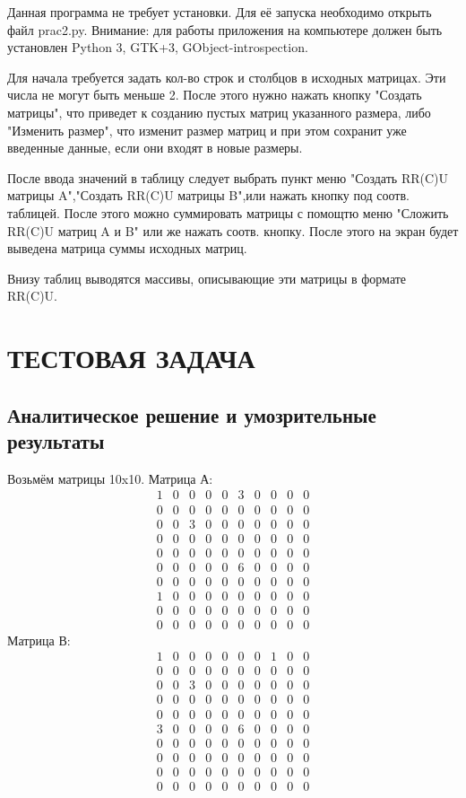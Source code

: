 Данная программа не требует установки. Для её запуска необходимо открыть файл prac2.py. Внимание: для работы приложения на компьютере должен быть установлен Python 3, GTK+3, GObject-introspection.

Для начала требуется задать кол-во строк и столбцов в исходных матрицах. Эти числа не могут быть меньше 2. После этого нужно нажать кнопку "Создать матрицы", что приведет к созданию пустых матриц указанного размера, либо "Изменить размер", что изменит размер матриц и при этом сохранит уже введенные данные, если они входят в новые размеры. 

После ввода значений в таблицу следует выбрать пункт меню "Создать RR(C)U матрицы A","Создать RR(C)U матрицы B",или нажать кнопку под соотв. таблицей. После этого можно суммировать матрицы с помощтю меню "Сложить RR(C)U матриц A и B" или же нажать соотв. кнопку. После этого на экран будет выведена матрица суммы исходных матриц.

Внизу таблиц выводятся  массивы, описывающие эти матрицы в формате RR(C)U.

\section{ТЕСТОВАЯ ЗАДАЧА}
\subsection{Аналитическое решение и умозрительные результаты}
Возьмём матрицы 10x10. Матрица А:
$$
\begin{array}{cccccccccc}
1	&0	&0	&0	&0	&3	&0	&0	&0	&0\\
0	&0	&0	&0	&0	&0	&0	&0	&0	&0\\
0	&0	&3	&0	&0	&0	&0	&0	&0	&0\\
0	&0	&0	&0	&0	&0	&0	&0	&0	&0\\
0	&0	&0	&0	&0	&0	&0	&0	&0	&0\\
0	&0	&0	&0	&0	&6	&0	&0	&0	&0\\
0	&0	&0	&0	&0	&0	&0	&0	&0	&0\\
1	&0	&0	&0	&0	&0	&0	&0	&0	&0\\
0	&0	&0	&0	&0	&0	&0	&0	&0	&0\\
0	&0	&0	&0	&0	&0	&0	&0	&0	&0
\end{array}
$$
Матрица В:
$$
\begin{array}{cccccccccc}
1	&0	&0	&0	&0	&0	&0	&1	&0	&0\\
0	&0	&0	&0	&0	&0	&0	&0	&0	&0\\
0	&0	&3	&0	&0	&0	&0	&0	&0	&0\\
0	&0	&0	&0	&0	&0	&0	&0	&0	&0\\
0	&0	&0	&0	&0	&0	&0	&0	&0	&0\\
3	&0	&0	&0	&0	&6	&0	&0	&0	&0\\
0	&0	&0	&0	&0	&0	&0	&0	&0	&0\\
0	&0	&0	&0	&0	&0	&0	&0	&0	&0\\
0	&0	&0	&0	&0	&0	&0	&0	&0	&0\\
0	&0	&0	&0	&0	&0	&0	&0	&0	&0
\end{array}
$$

